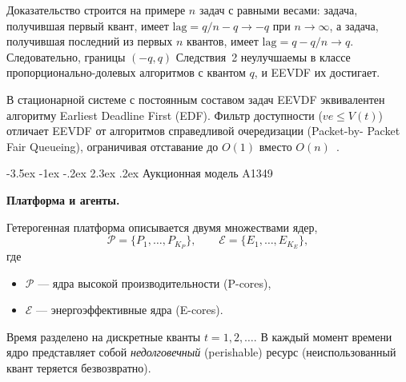 \documentclass[14pt, oneside]{extbook}
\makeatletter
\renewcommand\section{\@startsection {section}{1}{\z@}%
                                   {-3.5ex \@plus -1ex \@minus -.2ex}%
                                   {2.3ex \@plus.2ex}%
                                   {\normalfont\fontsize{16}{20}\selectfont\bfseries}}
\makeatother
\begin{document}
        Доказательство строится на примере $n$ задач с равными
        весами: задача, получившая первый квант, имеет
        $\mathrm{lag} = q/n - q \to -q$ при $n \to \infty$, а
        задача, получившая последний из первых $n$ квантов, имеет
        $\mathrm{lag} = q - q/n \to q$. Следовательно, границы
        $(-q, q)$ Следствия~2 неулучшаемы в классе
        пропорционально-долевых алгоритмов с квантом $q$, и EEVDF
        их достигает.

        В стационарной системе с постоянным составом
        задач EEVDF эквивалентен алгоритму Earliest Deadline
        First (EDF). Фильтр доступности ($ve \leq V(t)$) отличает
        EEVDF от алгоритмов справедливой очередизации (Packet-by-%
        Packet Fair Queueing), ограничивая отставание до $O(1)$
        вместо $O(n)$~\cite{stoica}.


\section{Аукционная модель A1349}\label{sec:auction-model}

\textbf{Платформа и агенты.}

        Гетерогенная платформа описывается двумя множествами
        ядер,
        \begin{equation*}
                \mathcal{P} = \{P_1, \ldots, P_{K_P}\},
                \qquad
                \mathcal{E} = \{E_1, \ldots, E_{K_E}\},
        \end{equation*}
        где
        \begin{itemize}
                \item $\mathcal{P}$ --- ядра высокой
                        производительности (P-cores),
                \item $\mathcal{E}$ --- энергоэффективные ядра
                        (E-cores).
        \end{itemize}
        Время разделено на дискретные кванты $t = 1, 2, \ldots$.
        В каждый момент времени ядро представляет собой
        \emph{недолговечный} (perishable) ресурс (неиспользованный
        квант теряется безвозвратно).
\end{document}
